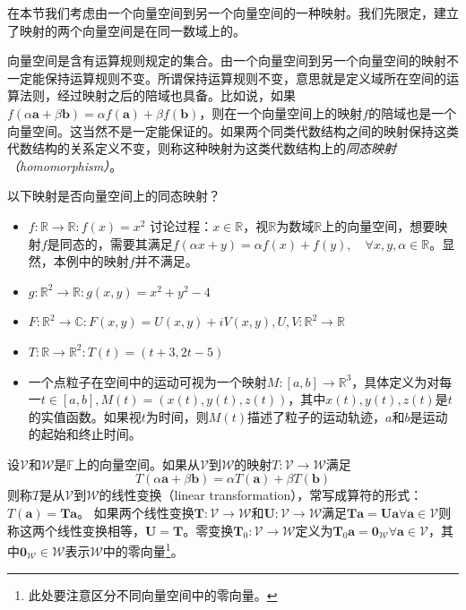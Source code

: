 \documentclass[main.tex]{subfiles}
\begin{document}
在本节我们考虑由一个向量空间到另一个向量空间的一种映射。我们先限定，建立了映射的两个向量空间是在同一数域上的。

向量空间是含有运算规则规定的集合。由一个向量空间到另一个向量空间的映射不一定能保持运算规则不变。所谓保持运算规则不变，意思就是定义域所在空间的运算法则，经过映射之后的陪域也具备。比如说，如果$f\left(\alpha\mathbf{a}+\beta\mathbf{b}\right)=\alpha f\left(\mathbf{a}\right)+\beta f\left(\mathbf{b}\right)$，则在一个向量空间上的映射$f$的陪域也是一个向量空间。这当然不是一定能保证的。如果两个同类代数结构之间的映射保持这类代数结构的关系定义不变，则称这种映射为这类代数结构上的\emph{同态映射（homomorphism）}。
\begin{example}
    以下映射是否向量空间上的同态映射？
    \begin{itemize}
        \item $f:\mathbb{R}\rightarrow\mathbb{R}:f\left(x\right)=x^2$
              讨论过程：$x\in\mathbb{R}$，视$\mathbb{R}$为数域$\mathbb{R}$上的向量空间，想要映射$f$是同态的，需要其满足$f\left(\alpha x+ y\right)=\alpha f\left(x\right)+f\left(y\right),\quad\forall x,y,\alpha\in\mathbb{R}$。显然，本例中的映射$f$并不满足。
        \item $g:\mathbb{R}^2\rightarrow\mathbb{R}:g\left(x,y\right)=x^2+y^2-4$
        \item $F:\mathbb{R}^2\rightarrow\mathbb{C}:F\left(x,y\right)=U\left(x,y\right)+iV\left(x,y\right),U,V:\mathbb{R}^2\rightarrow\mathbb{R}$
        \item $T:\mathbb{R}\rightarrow\mathbb{R}^2:T\left(t\right)=\left(t+3,2t-5\right)$
        \item 一个点粒子在空间中的运动可视为一个映射$M:\left[a,b\right]\rightarrow\mathbb{R}^3$，具体定义为对每一$t\in\left[a,b\right],M\left(t\right)=\left(x\left(t\right),y\left(t\right),z\left(t\right)\right)$，其中$x\left(t\right),y\left(t\right),z\left(t\right)$是$t$的实值函数。如果视$t$为时间，则$M\left(t\right)$描述了粒子的运动轨迹，$a$和$b$是运动的起始和终止时间。
    \end{itemize}
\end{example}

\begin{definition}[线性变换]\label{def:II.2.11}
    设$\mathcal{V}$和$\mathcal{W}$是$\mathbb{F}$上的向量空间。如果从$\mathcal{V}$到$\mathcal{W}$的映射$T:\mathcal{V}\rightarrow\mathcal{W}$满足
    \[T\left(\alpha\mathbf{a}+\beta\mathbf{b}\right)=\alpha T\left(\mathbf{a}\right)+\beta T\left(\mathbf{b}\right)\]
    则称$T$是从$\mathcal{V}$到$\mathcal{W}$的线性变换（linear transformation），常写成算符的形式：$T\left(\mathbf{a}\right)=\mathbf{Ta}$。
    如果两个线性变换$\mathbf{T}:\mathcal{V}\rightarrow\mathcal{W}$和$\mathbf{U}:\mathcal{V}\rightarrow\mathcal{W}$满足$\mathbf{Ta}=\mathbf{Ua}\forall\mathbf{a}\in\mathcal{V}$则称这两个线性变换相等，$\mathbf{U}=\mathbf{T}$。零变换$\mathbf{T}_0:\mathcal{V}\rightarrow\mathcal{W}$定义为$\mathbf{T}_0\mathbf{a}=\mathbf{0}_{\mathcal{W}}\forall\mathbf{a}\in\mathcal{V}$，其中$\mathbf{0}_{\mathcal{W}}\in\mathcal{W}$表示$\mathcal{W}$中的零向量\footnote{此处要注意区分不同向量空间中的零向量。}。
\end{definition}
\end{document}
